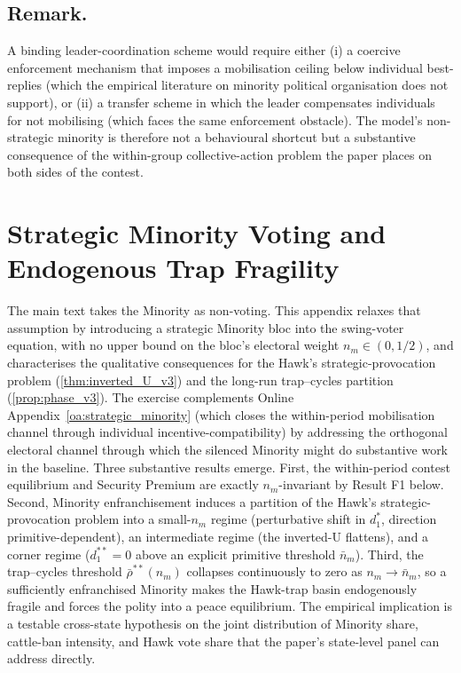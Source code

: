 \documentclass[11pt,twoside]{extarticle}
\begin{document}
\subsection*{Remark.} A binding leader-coordination scheme would require either (i) a coercive enforcement mechanism that imposes a mobilisation ceiling below individual best-replies (which the empirical literature on minority political organisation does not support), or (ii) a transfer scheme in which the leader compensates individuals for not mobilising (which faces the same enforcement obstacle). The model's non-strategic minority is therefore not a behavioural shortcut but a substantive consequence of the within-group collective-action problem the paper places on both sides of the contest.


\section{Strategic Minority Voting and Endogenous Trap Fragility}\label{oa:strategic_minority_voting}

The main text takes the Minority as non-voting. This appendix relaxes that assumption by introducing a strategic Minority bloc into the swing-voter equation, with no upper bound on the bloc's electoral weight $n_m\in(0,1/2)$, and characterises the qualitative consequences for the Hawk's strategic-provocation problem (\autoref{thm:inverted_U_v3}) and the long-run trap--cycles partition (\autoref{prop:phase_v3}). The exercise complements Online Appendix~\ref{oa:strategic_minority} (which closes the within-period mobilisation channel through individual incentive-compatibility) by addressing the orthogonal electoral channel through which the silenced Minority might do substantive work in the baseline. Three substantive results emerge. First, the within-period contest equilibrium and Security Premium are exactly $n_m$-invariant by Result F1 below. Second, Minority enfranchisement induces a partition of the Hawk's strategic-provocation problem into a small-$n_m$ regime (perturbative shift in $d_1^{*}$, direction primitive-dependent), an intermediate regime (the inverted-U flattens), and a corner regime ($d_1^{**}=0$ above an explicit primitive threshold $\bar n_m$). Third, the trap--cycles threshold $\bar\rho^{**}(n_m)$ collapses continuously to zero as $n_m\to\bar n_m$, so a sufficiently enfranchised Minority makes the Hawk-trap basin endogenously fragile and forces the polity into a peace equilibrium. The empirical implication is a testable cross-state hypothesis on the joint distribution of Minority share, cattle-ban intensity, and Hawk vote share that the paper's state-level panel can address directly.
\end{document}
